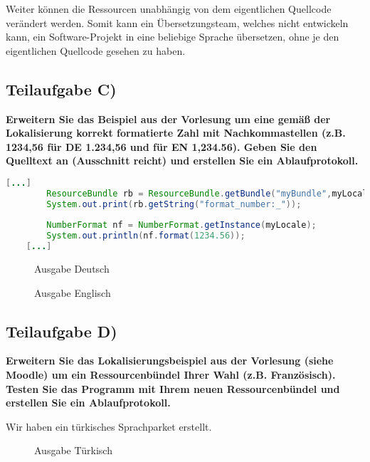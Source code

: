 Weiter können die Ressourcen unabhängig von dem eigentlichen Quellcode verändert
werden. Somit kann ein Übersetzungsteam, welches nicht entwickeln kann, ein
Software-Projekt in eine beliebige Sprache übersetzen, ohne je den eigentlichen
Quellcode gesehen zu haben. 

\subsection{Teilaufgabe C)}
\textbf{Erweitern Sie das Beispiel aus der Vorlesung um eine gemäß der Lokalisierung korrekt
formatierte Zahl mit Nachkommastellen (z.B. 1234,56 für DE 1.234,56 und für EN
1,234.56). Geben Sie den Quelltext an (Ausschnitt reicht) und erstellen Sie ein
Ablaufprotokoll.}

\begin{lstlisting}[language=java, style=java, caption={NumberFormat},
label={lst:lst1}]
	[...]
        ResourceBundle rb = ResourceBundle.getBundle("myBundle",myLocale);
        System.out.print(rb.getString("format_number:_"));
        
        NumberFormat nf = NumberFormat.getInstance(myLocale);
        System.out.println(nf.format(1234.56));       
    [...]
\end{lstlisting}
\begin{figure}[htb]
\begin{center}
\caption{Ausgabe Deutsch}
\end{center}
\end{figure}

\begin{figure}[htb]
\begin{center}
\caption{Ausgabe Englisch}
\end{center}
\end{figure}

\clearpage
\subsection{Teilaufgabe D)}
\textbf{Erweitern Sie das Lokalisierungsbeispiel aus der Vorlesung (siehe Moodle) um ein
Ressourcenbündel Ihrer Wahl (z.B. Französisch). Testen Sie das Programm mit Ihrem
neuen Ressourcenbündel und erstellen Sie ein Ablaufprotokoll.}

Wir haben ein türkisches Sprachparket erstellt.

\begin{figure}[htb]
\begin{center}
\caption{Ausgabe Türkisch}
\end{center}
\end{figure}

